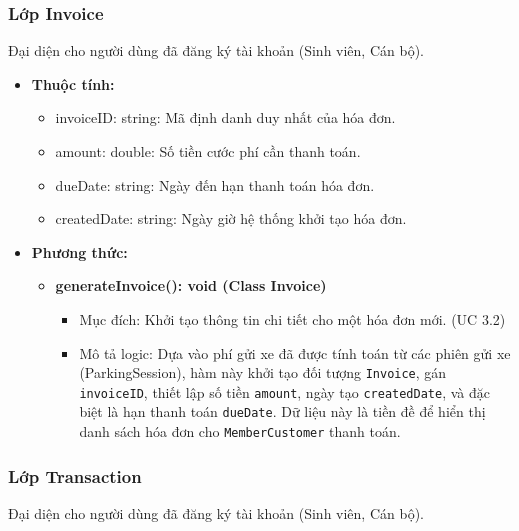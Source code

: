 \subsubsection{Lớp Invoice}
Đại diện cho người dùng đã đăng ký tài khoản (Sinh viên, Cán bộ).

\begin{itemize}
    \item \textbf{Thuộc tính:}
    \begin{itemize}
        \item invoiceID: string: Mã định danh duy nhất của hóa đơn.
        \item amount: double: Số tiền cước phí cần thanh toán.
        \item dueDate: string: Ngày đến hạn thanh toán hóa đơn.
        \item createdDate: string: Ngày giờ hệ thống khởi tạo hóa đơn.
    \end{itemize}







    \item \textbf{Phương thức:}
    \begin{itemize}
        \item \textbf{generateInvoice(): void (Class Invoice)}
        \begin{itemize}
            \item Mục đích: Khởi tạo thông tin chi tiết cho một hóa đơn mới. (UC 3.2)

            \item Mô tả logic: Dựa vào phí gửi xe đã được tính toán từ các phiên gửi xe (ParkingSession), hàm này khởi tạo đối tượng \texttt{Invoice}, gán \texttt{invoiceID}, thiết lập số tiền \texttt{amount}, ngày tạo \texttt{createdDate}, và đặc biệt là hạn thanh toán \texttt{dueDate}. Dữ liệu này là tiền đề để hiển thị danh sách hóa đơn cho \texttt{MemberCustomer} thanh toán.
        \end{itemize}
    \end{itemize}
\end{itemize}





\subsubsection{Lớp Transaction}
Đại diện cho người dùng đã đăng ký tài khoản (Sinh viên, Cán bộ).

